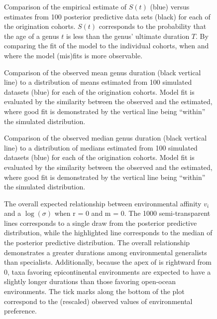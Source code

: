 \documentclass[11pt]{article}
\begin{document}
\begin{figure}[ht]
  \centering
  \caption{Comparison of the empirical estimate of \(S(t)\) (blue) versus estimates from 100 posterior predictive data sets (black) for each of the origination cohorts. \(S(t)\) corresponds to the probability that the age of a genus \(t\) is less than the genus' ultimate duration \(T\). By comparing the fit of the model to the individual cohorts, when and where the model (mis)fits is more observable. }
  \label{fig:surv_group}
\end{figure}

\begin{figure}[ht]
  \centering
  \caption{ Comparison of the observed mean genus duration (black vertical line) to a distribution of means estimated from 100 simulated datasets (blue) for each of the origination cohorts. Model fit is evaluated by the similarity between the observed and the estimated, where good fit is demonstrated by the vertical line being ``within'' the simulated distribution. }
  \label{fig:group_mean}
\end{figure}

\begin{figure}[ht]
  \centering
  \caption{ Comparison of the observed median genus duration (black vertical line) to a distribution of medians estimated from 100 simulated datasets (blue) for each of the origination cohorts. Model fit is evaluated by the similarity between the observed and the estimated, where good fit is demonstrated by the vertical line being ``within'' the simulated distribution. }
  \label{fig:group_median}
\end{figure}

\begin{figure}[ht]
  \centering
  \caption{The overall expected relationship between environmental affinity \(v_{i}\) and a \(\log(\sigma)\) when r = 0 and m = 0. The 1000 semi-transparent lines corresponds to a single draw from the posterior predictive distribution, while the highlighted line corresponds to the median of the posterior predictive distribution. The overall relationship demonstrates a greater durations among environmental generalists than specialists. Additionally, because the apex of is rightward from 0, taxa favoring epicontinental environments are expected to have a slightly longer durations than those favoring open-ocean environments. The tick marks along the bottom of the plot correspond to the (rescaled) observed values of environmental preference.}
  \label{fig:env_mean}
\end{figure}
\end{document}
